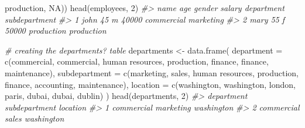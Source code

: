 \documentclass[
]{book}
\newenvironment{Shaded}{\begin{snugshade}}{\end{snugshade}}
\newcommand{\AttributeTok}[1]{\textcolor[rgb]{0.77,0.63,0.00}{#1}}
\newcommand{\CommentTok}[1]{\textcolor[rgb]{0.56,0.35,0.01}{\textit{#1}}}
\newcommand{\ConstantTok}[1]{\textcolor[rgb]{0.00,0.00,0.00}{#1}}
\newcommand{\DecValTok}[1]{\textcolor[rgb]{0.00,0.00,0.81}{#1}}
\newcommand{\FunctionTok}[1]{\textcolor[rgb]{0.00,0.00,0.00}{#1}}
\newcommand{\NormalTok}[1]{#1}
\newcommand{\OtherTok}[1]{\textcolor[rgb]{0.56,0.35,0.01}{#1}}
\newcommand{\StringTok}[1]{\textcolor[rgb]{0.31,0.60,0.02}{#1}}
\begin{document}
\begin{Shaded}
\begin{Highlighting}[]
                    \StringTok{\textquotesingle{}production\textquotesingle{}}\NormalTok{, }\ConstantTok{NA}\NormalTok{))}
\FunctionTok{head}\NormalTok{(employees, }\DecValTok{2}\NormalTok{)}
\CommentTok{\#\textgreater{}   name age gender salary department subdepartment}
\CommentTok{\#\textgreater{} 1 john  45      m  40000 commercial     marketing}
\CommentTok{\#\textgreater{} 2 mary  55      f  50000 production    production}

\CommentTok{\# creating the departments? table}
\NormalTok{departments }\OtherTok{\textless{}{-}} \FunctionTok{data.frame}\NormalTok{(}
  \AttributeTok{department =} \FunctionTok{c}\NormalTok{(}\StringTok{\textquotesingle{}commercial\textquotesingle{}}\NormalTok{, }\StringTok{\textquotesingle{}commercial\textquotesingle{}}\NormalTok{, }\StringTok{\textquotesingle{}human resources\textquotesingle{}}\NormalTok{, }\StringTok{\textquotesingle{}production\textquotesingle{}}\NormalTok{, }\StringTok{\textquotesingle{}finance\textquotesingle{}}\NormalTok{, }
                 \StringTok{\textquotesingle{}finance\textquotesingle{}}\NormalTok{, }\StringTok{\textquotesingle{}maintenance\textquotesingle{}}\NormalTok{),}
  \AttributeTok{subdepartment =} \FunctionTok{c}\NormalTok{(}\StringTok{\textquotesingle{}marketing\textquotesingle{}}\NormalTok{, }\StringTok{\textquotesingle{}sales\textquotesingle{}}\NormalTok{, }\StringTok{\textquotesingle{}human resources\textquotesingle{}}\NormalTok{, }\StringTok{\textquotesingle{}production\textquotesingle{}}\NormalTok{, }\StringTok{\textquotesingle{}finance\textquotesingle{}}\NormalTok{, }
                    \StringTok{\textquotesingle{}accounting\textquotesingle{}}\NormalTok{, }\StringTok{\textquotesingle{}maintenance\textquotesingle{}}\NormalTok{),}
  \AttributeTok{location =} \FunctionTok{c}\NormalTok{(}\StringTok{\textquotesingle{}washington\textquotesingle{}}\NormalTok{, }\StringTok{\textquotesingle{}washington\textquotesingle{}}\NormalTok{, }\StringTok{\textquotesingle{}london\textquotesingle{}}\NormalTok{, }\StringTok{\textquotesingle{}paris\textquotesingle{}}\NormalTok{, }\StringTok{\textquotesingle{}dubai\textquotesingle{}}\NormalTok{, }\StringTok{\textquotesingle{}dubai\textquotesingle{}}\NormalTok{, }\StringTok{\textquotesingle{}dublin\textquotesingle{}}\NormalTok{)}
\NormalTok{)}
\FunctionTok{head}\NormalTok{(departments, }\DecValTok{2}\NormalTok{)}
\CommentTok{\#\textgreater{}   department subdepartment   location}
\CommentTok{\#\textgreater{} 1 commercial     marketing washington}
\CommentTok{\#\textgreater{} 2 commercial         sales washington}


\end{Highlighting}
\end{Shaded}
\end{document}

